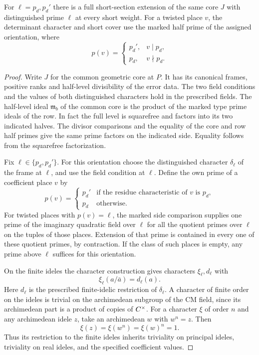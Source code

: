 \begin{lemma}
For \(\ell=p_d,p_d'\) there is a full short-section extension of
the same core \(J\) with distinguished prime \(\ell\) at every
short weight. For a twisted place \(v\), the determinant character and short cover use the marked half prime of the assigned orientation, where
\[
 p(v)=\begin{cases}p_d',&v\mid p_d,\\ p_d,&v\nmid p_d.\end{cases}
\]
\end{lemma}
\begin{proof}
Write \(J\) for the common geometric core at \(P\). It
has its canonical frames, positive ranks and half-level
divisibility of the error data. The two field conditions and
the values of both distinguished characters hold in the
prescribed fields. The half-level ideal \(\mathfrak m_b\)
of the common core is the product of the marked type prime
ideals of the row. In fact the full level is squarefree
and factors into its two indicated halves. The divisor
comparisons and the equality of the core and row half
primes give the same prime factors on the indicated
side. Equality follows from the squarefree factorization.

Fix \(\ell\in\{p_d,p_d'\}\). For this orientation choose
the distinguished character \(\delta_\ell\) of the frame at
\(\ell\), and use the field condition at \(\ell\). Define
the own prime of a coefficient place \(v\) by
\[
  p(v)=
  \begin{cases}
    p_d' & \text{if the residue characteristic of \(v\) is \(p_d\)},\\
    p_d & \text{otherwise}.
  \end{cases}
\]
For twisted places with \(p(v)=\ell\), the marked side
comparison supplies one prime of the imaginary quadratic
field over \(\ell\) for all the quotient primes over
\(\ell\) on the tuples of those places. Extension of that
prime is contained in every one of these quotient primes,
by contraction. If the class of such places is empty, any
prime above \(\ell\) suffices for this orientation.

On the finite ideles the character construction gives
characters \(\xi_\ell,d_\ell\) with
\[
                        \xi_\ell(a/\bar a)=d_\ell(a).
\]
Here \(d_\ell\) is the prescribed finite-idelic restriction of
\(\delta_\ell\). A character of finite order on the ideles
is trivial on the archimedean subgroup of the CM field,
since its archimedean part is a product of copies of \(C^\times\).
For a character \(\xi\) of order \(n\) and any archimedean idele
\(z\), take an archimedean \(w\) with \(w^n=z\). Then
\[
 \xi(z)=\xi(w^n)=\xi(w)^n=1 .
\] Thus
its restriction to the finite ideles inherits triviality on principal ideles,
triviality on real ideles, and the specified coefficient
values.


\end{proof}
